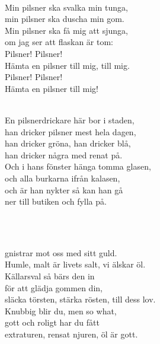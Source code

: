 

 \\       

\songtext{}
Min pilsner ska svalka min tunga,   \\
min pilsner ska duscha min gom.   \\
Min pilsner ska få mig att sjunga,   \\ 
om jag ser att flaskan är tom:  \\
Pilsner! Pilsner!   \\
Hämta en pilsner till mig, till mig.   \\
Pilsner! Pilsner!   \\
Hämta en pilsner till mig!  \\



 \\       

\songtext{}
En pilsnerdrickare här bor i staden, \\ 
han dricker pilsner mest hela dagen, \\ 
han dricker gröna, han dricker blå, \\ 
han dricker några med renat på. \\ 
Och i hans fönster hänga tomma glasen, \\ 
och alla burkarna ifrån kalasen, \\ 
och är han nykter så kan han gå \\ 
ner till butiken och fylla på. \\

\newpage


 \\       

 \\
gnistrar mot oss med sitt guld. \\
Humle, malt är livets salt, vi älskar öl. \\
Källarsval så bärs den in \\
för att glädja gommen din, \\
släcka törsten, stärka rösten, till dess lov. \\
Knubbig blir du, men so what, \\
gott och roligt har du fått \\
extraturen, rensat njuren, öl är gott. \\

